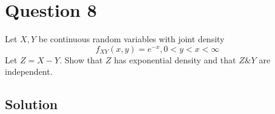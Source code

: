 \section*{Question 8}

Let \( X, Y \) be continuous random variables with joint density
\[
    f_{X Y}(x, y)=e^{-x}, 0<y<x<\infty
\]
Let \( Z=X-Y \).
Show that \( Z \) has exponential density and that \( Z \& Y \) are independent.


\subsection*{Solution}
